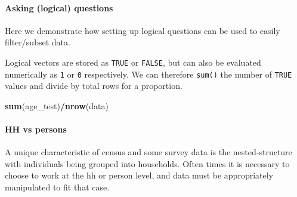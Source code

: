 \documentclass[
]{book}
\newenvironment{Shaded}{\begin{snugshade}}{\end{snugshade}}
\newcommand{\DecValTok}[1]{\textcolor[rgb]{0.00,0.00,0.81}{#1}}
\newcommand{\KeywordTok}[1]{\textcolor[rgb]{0.13,0.29,0.53}{\textbf{#1}}}
\newcommand{\NormalTok}[1]{#1}
\newcommand{\OperatorTok}[1]{\textcolor[rgb]{0.81,0.36,0.00}{\textbf{#1}}}
\newcommand{\StringTok}[1]{\textcolor[rgb]{0.31,0.60,0.02}{#1}}
\begin{document}
\hypertarget{asking-logical-questions}{%
\paragraph{Asking (logical) questions}\label{asking-logical-questions}}

Here we demonstrate how setting up logical questions can be used to easily filter/subset data.

\begin{Shaded}
\end{Shaded}

Logical vectors are stored as \texttt{TRUE} or \texttt{FALSE}, but can also be evaluated numerically as \texttt{1} or \texttt{0} respectively. We can therefore \texttt{sum()} the number of \texttt{TRUE} values and divide by total rows for a proportion.

\begin{Shaded}
\begin{Highlighting}[]
\KeywordTok{sum}\NormalTok{(age_test)}\OperatorTok{/}\KeywordTok{nrow}\NormalTok{(data)}
\end{Highlighting}
\end{Shaded}

\hypertarget{hh-vs-persons}{%
\paragraph{HH vs persons}\label{hh-vs-persons}}

A unique characteristic of census and some survey data is the nested-structure with individuals being grouped into households. Often times it is necessary to choose to work at the hh or person level, and data must be appropriately manipulated to fit that case.

\begin{Shaded}
\end{Shaded}
\end{document}
